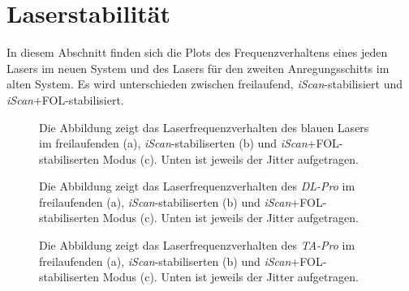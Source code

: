 \section{Laserstabilität}\label{anh:sec:laserstabilitaet}
In diesem Abschnitt finden sich die Plots des Frequenzverhaltens eines jeden
Lasers im neuen System und des Lasers für den zweiten Anregungsschitts im alten
System. Es wird unterschieden zwischen freilaufend, \textit{iScan}-stabilisiert
und \textit{iScan}+FOL-stabilisiert.
\begin{figure}[hp]
 	\centering
 	\footnotesize
 	\fbox{\parbox{\dimexpr \linewidth - 2\fboxrule - 2\fboxsep}{
 	\subfigure[]{
		\label{subfig:laserstabilitaet_a_freilaufend}
		
		}
 	\subfigure[]{
		\label{subfig:laserstabilitaet_a_iScan}
		
		}
	 \subfigure[]{
		\label{subfig:laserstabilitaet_a_iScan+FOL}
		
		}
	}}
	\caption[Laserfrequenzverhalten blauer Laser]{Die Abbildung zeigt das
	Laserfrequenzverhalten des blauen Lasers im freilaufenden (a),
	\textit{iScan}-stabiliserten (b) und \textit{iScan}+FOL-stabiliserten Modus
	(c). Unten ist jeweils der Jitter aufgetragen.}
	\label{fig:laserstabilitaet_a}
\end{figure}
\begin{figure}[hp]
 	\centering
 	\footnotesize
 	\fbox{\parbox{\dimexpr \linewidth - 2\fboxrule - 2\fboxsep}{
 	\subfigure[]{
		\label{subfig:laserstabilitaet_b_freilaufend}
		
		}
 	\subfigure[]{
		\label{subfig:laserstabilitaet_b_iScan}
		
		}
	 \subfigure[]{
		\label{subfig:laserstabilitaet_b_iScan+FOL}
		
		}
	}}
	\caption[Laserfrequenzverhalten \textit{DL-Pro}]{Die Abbildung zeigt das
	Laserfrequenzverhalten des \textit{DL-Pro} im freilaufenden (a),
	\textit{iScan}-stabiliserten (b) und \textit{iScan}+FOL-stabiliserten Modus
	(c). Unten ist jeweils der Jitter aufgetragen.}
	\label{fig:laserstabilitaet_b}
\end{figure}
\begin{figure}[hp]
 	\centering
 	\footnotesize
 	\fbox{\parbox{\dimexpr \linewidth - 2\fboxrule - 2\fboxsep}{
 	\subfigure[]{
		\label{subfig:laserstabilitaet_c_freilaufend}
		
		}
 	\subfigure[]{
		\label{subfig:laserstabilitaet_c_iScan}
		
		}
	 \subfigure[]{
		\label{subfig:laserstabilitaet_c_iScan+FOL}
		
		}
	}}
	\caption[Laserfrequenzverhalten \textit{TA-Pro}]{Die Abbildung zeigt das
	Laserfrequenzverhalten des \textit{TA-Pro} im freilaufenden (a),
	\textit{iScan}-stabiliserten (b) und \textit{iScan}+FOL-stabiliserten Modus
	(c). Unten ist jeweils der Jitter aufgetragen.}
	\label{fig:laserstabilitaet_c}
\end{figure}
